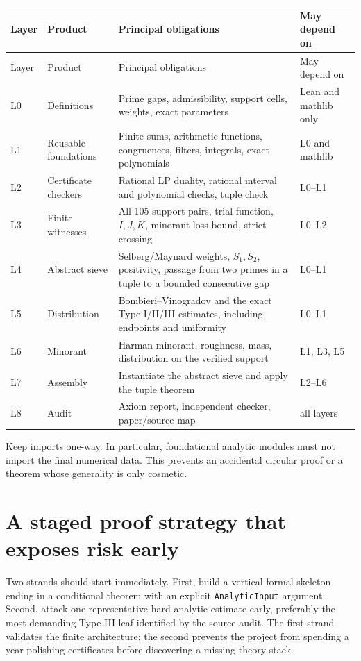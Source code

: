 \documentclass[11pt]{article}
\newcommand{\leanname}[1]{\texttt{#1}}
\begin{document}
\begin{longtable}{p{}p{}p{}p{}}
\toprule
Layer & Product & Principal obligations & May depend on \\
\midrule
\endfirsthead
\toprule
Layer & Product & Principal obligations & May depend on \\
\midrule
\endhead
L0 & Definitions & Prime gaps, admissibility, support cells, weights, exact
parameters & Lean and mathlib only \\
L1 & Reusable foundations & Finite sums, arithmetic functions, congruences,
filters, integrals, exact polynomials & L0 and mathlib \\
L2 & Certificate checkers & Rational LP duality, rational interval and
polynomial checks, tuple check & L0--L1 \\
L3 & Finite witnesses & All 105 support pairs, trial function, \(I,J,K\),
minorant-loss bound, strict crossing & L0--L2 \\
L4 & Abstract sieve & Selberg/Maynard weights, \(S_1,S_2\), positivity, passage
from two primes in a tuple to a bounded consecutive gap & L0--L1 \\
L5 & Distribution & Bombieri--Vinogradov and the exact Type-I/II/III estimates,
including endpoints and uniformity & L0--L1 \\
L6 & Minorant & Harman minorant, roughness, mass, distribution on the verified
support & L1, L3, L5 \\
L7 & Assembly & Instantiate the abstract sieve and apply the tuple theorem &
L2--L6 \\
L8 & Audit & Axiom report, independent checker, paper/source map & all layers \\
\bottomrule
\end{longtable}

Keep imports one-way.  In particular, foundational analytic modules must not
import the final numerical data.  This prevents an accidental circular proof
or a theorem whose generality is only cosmetic.

\section{A staged proof strategy that exposes risk early}

Two strands should start immediately.  First, build a vertical formal skeleton
ending in a conditional theorem with an explicit \leanname{AnalyticInput}
argument.  Second, attack one representative hard analytic estimate early,
preferably the most demanding Type-III leaf identified by the source audit.
The first strand validates the finite architecture; the second prevents the
project from spending a year polishing certificates before discovering a
missing theory stack.
\end{document}
